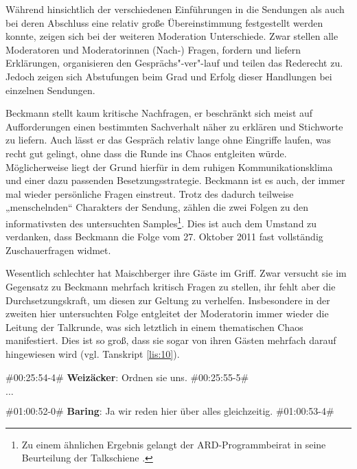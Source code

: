 Während hinsichtlich der verschiedenen Einführungen in die Sendungen als auch bei deren Abschluss eine relativ große Übereinstimmung festgestellt werden konnte, zeigen sich bei der weiteren Moderation Unterschiede. Zwar stellen alle Moderatoren und Moderatorinnen (Nach-) Fragen, fordern und liefern Erklärungen, organisieren den Gesprächs"-ver"-lauf und teilen das Rederecht zu. Jedoch zeigen sich Abstufungen beim Grad und Erfolg dieser Handlungen bei einzelnen Sendungen.

Beckmann stellt kaum kritische Nachfragen, er beschränkt sich meist auf Aufforderungen einen bestimmten Sachverhalt näher zu erklären und Stichworte zu liefern. Auch lässt er das Gespräch relativ lange ohne Eingriffe laufen, was recht gut gelingt, ohne dass die Runde ins Chaos entgleiten würde. Möglicherweise liegt der Grund hierfür in dem ruhigen Kommunikationsklima und einer dazu passenden Besetzungsstrategie. Beckmann ist es auch, der immer mal wieder persönliche Fragen einstreut. Trotz des dadurch teilweise „menschelnden“ Charakters der Sendung, zählen die zwei Folgen zu den informativsten des untersuchten Samples\footnote{Zu einem ähnlichen Ergebnis gelangt der ARD-Programmbeirat in seine Beurteilung der Talkschiene \parencite[8]{ard-programmbeiratTalkformateImErsten2012}.}. Dies ist auch dem Umstand zu verdanken, dass Beckmann die Folge vom 27. Oktober 2011 fast vollständig Zuschauerfragen widmet.

Wesentlich schlechter hat Maischberger ihre Gäste im Griff. Zwar versucht sie im Gegensatz zu Beckmann mehrfach kritisch Fragen zu stellen, ihr fehlt aber die Durchsetzungskraft, um diesen zur Geltung zu verhelfen. Insbesondere in der zweiten hier untersuchten Folge entgleitet der Moderatorin immer wieder die Leitung der Talkrunde, was sich letztlich in einem thematischen Chaos manifestiert. Dies ist so groß, dass sie sogar von ihren Gästen mehrfach darauf hingewiesen wird (vgl. Tanskript \vref{lis:10}).

\begin{description}
	\begin{linenumbers}[1]
		\item \#00:25:54-4\# \textbf{Weizäcker}: Ordnen sie uns. \#00:25:55-5\#
		
		\item $\ldots$
		
		\item \#01:00:52-0\# \textbf{Baring}: Ja wir reden hier über alles gleichzeitig. \#01:00:53-4\#
	\end{linenumbers}
	\label{lis:10}
\end{description}

